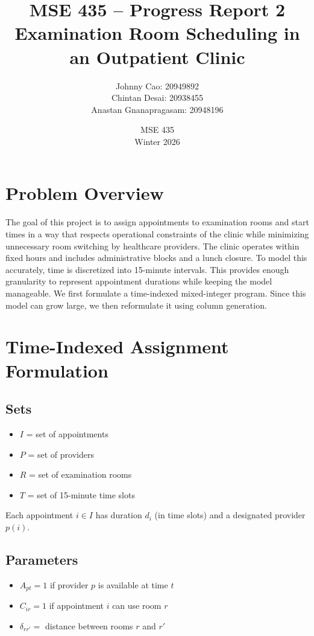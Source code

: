 \documentclass[12pt]{article}
\title{MSE 435 -- Progress Report 2\\[0.5em]
\large Examination Room Scheduling in an Outpatient Clinic}
\author{
  Johnny Cao: 20949892 \\
  Chintan Desai: 20938455 \\
  Anastan Gnanapragasam: 20948196
}
\date{MSE 435 \\ Winter 2026}
\begin{document}
\maketitle

\section{Problem Overview}

The goal of this project is to assign appointments to examination rooms and start times in a way
that respects operational constraints of the clinic while minimizing unnecessary room switching by
healthcare providers. The clinic operates within fixed hours and includes administrative blocks and
a lunch closure. To model this accurately, time is discretized into 15-minute intervals. This provides
enough granularity to represent appointment durations while keeping the model manageable. We
first formulate a time-indexed mixed-integer program. Since this model can grow large, we then
reformulate it using column generation.

\section{Time-Indexed Assignment Formulation}

\subsection*{Sets}
\begin{itemize}
  \item $I$ = set of appointments
  \item $P$ = set of providers
  \item $R$ = set of examination rooms
  \item $T$ = set of 15-minute time slots
\end{itemize}

Each appointment $i \in I$ has duration $d_i$ (in time slots) and a designated provider $p(i)$.

\subsection*{Parameters}
\begin{itemize}
  \item $A_{pt} = 1$ if provider $p$ is available at time $t$
  \item $C_{ir} = 1$ if appointment $i$ can use room $r$
  \item $\delta_{rr'} =$ distance between rooms $r$ and $r'$
\end{itemize}
\end{document}
